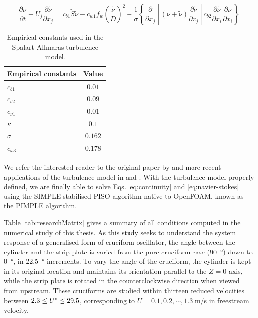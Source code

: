 \documentclass[oneside]{utmthesis}
\begin{document}
\begin{equation}
  \label{eq:kineticEddyTransport}
  \frac{\partial \tilde{\nu}}{\partial t} + U_{j} \frac{\partial \tilde{\nu}}{\partial x_{j}} = c_{b1}\tilde{S}\tilde{\nu} - c_{w1} f_{w} \left( \frac{\tilde{\nu}}{D} \right)^{2} + \frac{1}{\sigma} \left\{ \frac{\partial}{\partial x_{j}} \left[ \left( \nu + \tilde{\nu} \right) \frac{\partial \tilde{\nu}}{\partial x_{j}} \right] c_{b2} \frac{\partial \tilde{\nu}}{\partial x_{i}} \frac{\partial \tilde{\nu}}{\partial x_{i}} \right\}
\end{equation}

\begin{table}[!ht]
\centering
\caption{Empirical constants used in the Spalart-Allmaras turbulence model.} \label{tab:spalart-Allmaras}
\vspace{\baselineskip}
\begin{tabular}{l c}
  \hline
  \hline

  Empirical constants & Value    \\
  \hline

  $c_{b1}$            & $0.01$   \\
  $c_{b2}$            & $0.09$   \\
  $c_{\nu1}$          & $0.01$   \\
  $\kappa$            & $0.1$    \\
  $\sigma$            & $0.162$  \\
  $c_{\omega3}$       & $0.178$  \\
  \hline
  \hline
\end{tabular}
\end{table}

\noindent We refer the interested reader to the original paper by \citet{Spalart1992} and more recent applications of the turbulence model in \citet{Ding2019} and \citet{Sun2019b}. With the turbulence model properly defined, we are finally able to solve Eqs. \ref{eq:continuity} and \ref{eq:navier-stokes} using the SIMPLE-stabilised PISO algorithm native to OpenFOAM, known as the PIMPLE algorithm. 

Table \ref{tab:researchMatrix} gives a summary of all conditions computed in the numerical study of this thesis. As this study seeks to understand the system response of a generalised form of cruciform oscillator, the angle between the cylinder and the strip plate is varied from the pure cruciform case (\SI{90}{\degree}) down to \SI{0}{\degree}, in \SI{22.5}{\degree} increments. To vary the angle of the cruciform, the cylinder is kept in its original location and maintains its orientation parallel to the $Z=0$ axis, while the strip plate is rotated in the counterclockwise direction when viewed from upstream. These cruciforms are studied within thirteen reduced velocities between $2.3 \leq U^{*} \leq 29.5$, corresponding to $U = 0.1, 0.2, \cdots, 1.3$ m/s in freestream velocity. 
\end{document}

